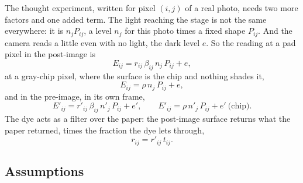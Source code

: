\documentclass[11pt,letter]{article}
\begin{document}
The thought experiment, written for pixel $(i, j)$ of a real photo, needs
two more factors and one added term.  The light reaching the stage is not
the same everywhere: it is $n_j P_{ij}$, a level $n_j$ for this photo times
a fixed shape $P_{ij}$.  And the camera reads a little even with no light,
the dark level $e$.  So the reading at a pad pixel in the post-image is
\begin{equation}
  E_{ij} = r_{ij}\, \beta_{ij}\, n_j\, P_{ij} + e ,
  \label{eq:model-pad}
\end{equation}
at a gray-chip pixel, where the surface is the chip and nothing shades it,
\begin{equation}
  E_{ij} = \rho\, n_j\, P_{ij} + e ,
  \label{eq:model-chip}
\end{equation}
and in the pre-image, in its own frame,
\begin{equation}
  E'_{ij} = r'_{ij}\, \beta_{ij}\, n'_j\, P_{ij} + e' , \qquad
  E'_{ij} = \rho\, n'_j\, P_{ij} + e' \ \text{(chip)}.
  \label{eq:model-pre}
\end{equation}
The dye acts as a filter over the paper: the post-image surface returns
what the paper returned, times the fraction the dye lets through,
\begin{equation}
  r_{ij} = r'_{ij}\, t_{ij} .
  \label{eq:dye}
\end{equation}

\subsection*{Assumptions}
\end{document}

